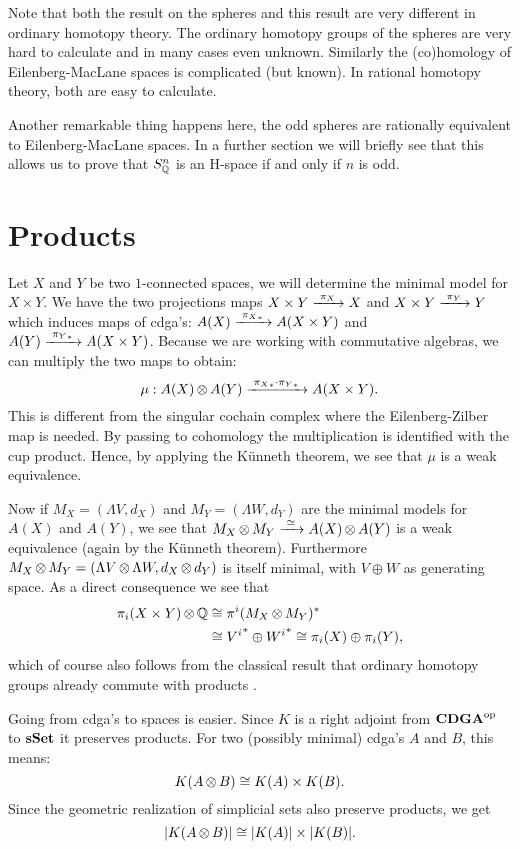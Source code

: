 Note that both the result on the spheres and this result are very different in ordinary homotopy theory. The ordinary homotopy groups of the spheres are very hard to calculate and in many cases even unknown. Similarly the (co)homology of Eilenberg-MacLane spaces is complicated (but known). In rational homotopy theory, both are easy to calculate.

Another remarkable thing happens here, the odd spheres are rationally equivalent to Eilenberg-MacLane spaces. In a further section we will briefly see that this allows us to prove that $S^n_{\mathbb{Q}}$ is an H-space if and only if $n$ is odd.


\section{Products}
Let $X$ and $Y$ be two $1$-connected spaces, we will determine the minimal model for $X \times Y$. We have the two projections maps $X \times Y \xrightarrow{\,\,{\pi_X}\,\,} X$ and $X \times Y \xrightarrow{\,\,{\pi_Y}\,\,} Y$ which induces maps of cdga's: $A(X) \xrightarrow{\,\,{{\pi_X}_\ast}\,\,} A(X \times Y)$ and $A(Y) \xrightarrow{\,\,{{\pi_Y}_\ast}\,\,} A(X \times Y)$. Because we are working with commutative algebras, we can multiply the two maps to obtain:
$$ \mu: A(X) \operatorname*{\otimes} A(Y) \xrightarrow{\,\,{{\pi_X}_\ast \cdot {\pi_Y}_\ast}\,\,} A(X \times Y). $$
This is different from the singular cochain complex where the Eilenberg-Zilber map is needed. By passing to cohomology the multiplication is identified with the cup product. Hence, by applying the Künneth theorem, we see that $\mu$ is a weak equivalence.

Now if $M_X = (\Lambda V, d_X)$ and $M_Y = (\Lambda W, d_Y)$ are the minimal models for $A(X)$ and $A(Y)$, we see that $M_X \operatorname*{\otimes} M_Y \xrightarrow{\,\,{\simeq}\,\,} A(X) \operatorname*{\otimes} A(Y)$ is a weak equivalence (again by the Künneth theorem). Furthermore $M_X \operatorname*{\otimes} M_Y = (\Lambda V \operatorname*{\otimes} \Lambda W, d_X \operatorname*{\otimes} d_Y)$ is itself minimal, with $V \oplus W$ as generating space. As a direct consequence we see that
\begin{align*}
	\pi_i(X \times Y) \operatorname*{\otimes} \mathbb{Q} &\cong \pi^i(M_X \operatorname*{\otimes} M_Y)^\ast \\
		&\cong {V^i}^\ast \oplus {W^i}^\ast \cong \pi_i(X) \oplus \pi_i(Y),
\end{align*}
which of course also follows from the classical result that ordinary homotopy groups already commute with products \cite{may}.

Going from cdga's to spaces is easier. Since $K$ is a right adjoint from ${\mathbf{CDGA}}^{\text{op}}$ to $\mathbf{s{\mathbf{Set}}}$ it preserves products. For two (possibly minimal) cdga's $A$ and $B$, this means:
$$ K(A \operatorname*{\otimes} B) \cong K(A) \times K(B). $$
Since the geometric realization of simplicial sets also preserve products, we get
$$ |K(A \operatorname*{\otimes} B)| \cong |K(A)| \times |K(B)|. $$


